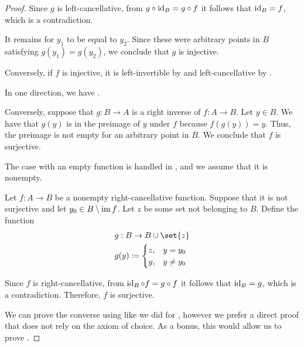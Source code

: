 \begin{proof}
  Since \( g \) is left-cancellative, from \( g \bincirc \id_B = g \bincirc f \) it follows that \( \operatorname{id}_B = f \), which is a contradiction.

  It remains for \( y_1 \) to be equal to \( y_2 \). Since these were arbitrary points in \( B \) satisfying \( g(y_1) = g(y_2) \), we conclude that \( g \) is injective.

  \NecessitySubProof* Conversely, if \( f \) is injective, it is left-invertible by  and left-cancellative by .


  \SufficiencySubProof* In one direction, we have .

  \NecessitySubProof* Conversely, suppose that \( g: B \to A \) is a right inverse of \( f: A \to B \). Let \( y \in B \). We have that \( g(y) \) is in the preimage of \( y \) under \( f \) because \( f(g(y)) = y \). Thus, the preimage is not empty for an arbitrary point in \( B \). We conclude that \( f \) is surjective.

   The case with an empty function is handled in , and we assume that it is nonempty.

  \SufficiencySubProof* Let \( f: A \to B \) be a nonempty right-cancellative function. Suppose that it is not surjective and let \( y_0 \in B \setminus \operatorname{im} f \). Let \( z \) be some set not belonging to \( B \). Define the function
  \begin{equation*}
    \begin{aligned}
      &g: B \to B \cup \set{ z } \\
      &g(y) \coloneqq \begin{cases}
        z, &y = y_0 \\
        y, &y \neq y_0
      \end{cases}
    \end{aligned}
  \end{equation*}

  Since \( f \) is right-cancellative, from \( \id_B \bincirc f = g \bincirc f \) it follows that \( \operatorname{id}_B = g \), which is a contradiction. Therefore, \( f \) is surjective.

  \NecessitySubProof* We can prove the converse using  like we did for , however we prefer a direct proof that does not rely on the axiom of choice. As a bonus, this would allow us to prove .


\end{proof}
